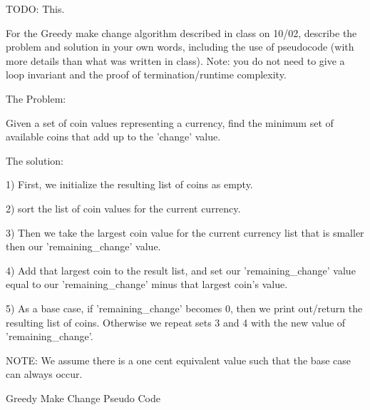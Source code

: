 \documentclass{article}
\begin{document}

TODO: This.

\nextprob
For the Greedy make change algorithm described in class on 10/02, describe the
problem and solution in your own words, including the use of pseudocode (with
more details than what was written in class).  Note: you do not need to give a
loop invariant and the proof of termination/runtime complexity.

The Problem:

Given a set of coin values representing a currency, find the minimum set of available coins that add up to the 'change' value.

The solution:

1) First, we initialize the resulting list of coins as empty.

2) sort the list of coin values for the current currency.

3) Then we take the largest coin value for the current currency list that is smaller then our 'remaining\_change' value.

4) Add that largest coin to the result list, and set our 'remaining\_change' value equal to our 'remaining\_change' minus that largest coin's value.

5) As a base case, if 'remaining\_change' becomes 0, then we print out/return the resulting list of coins. Otherwise we repeat sets 3 and 4 with the new value of 'remaining\_change'. 

NOTE: We assume there is a one cent equivalent value such that the base case can always occur.

\begin{algorithm}
    \caption{Greedy Make Change Pseudo Code}
    \begin{algorithmic}
            \State $result\_list$ = []
                \State return $result\_list$
            \EndIf
            
        \State sort(currency\_list, LARGE\_TO\_SMALL) 
        
                \State $result\_list.append(currency\_list[i])$  $remaining\_change$}
                \State $remaining\_change$ $-=$ currency\_list[i].value()
                \State Break
            \EndIf
        \EndFor
        
        \State $result\_list$.concatenate($Greedy\_Make\_Change(currency\_list$, $remaining\_changes)$)
        
        \State \textbf{return} result\_list
        \EndProcedure
    \end{algorithmic}
\end{algorithm}
\end{document}
